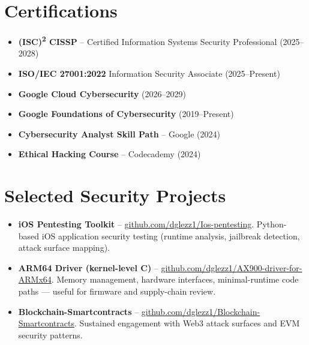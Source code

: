 \documentclass[11pt,a4paper,sans]{moderncv}
\begin{document}
\section{Certifications}
\vspace{1pt}
\begin{itemize}
\item \textbf{(ISC)\textsuperscript{2} CISSP} -- Certified Information Systems Security Professional (2025--2028)
\item \textbf{ISO/IEC 27001:2022} Information Security Associate (2025--Present)
\item \textbf{Google Cloud Cybersecurity} (2026--2029)
\item \textbf{Google Foundations of Cybersecurity} (2019--Present)
\item \textbf{Cybersecurity Analyst Skill Path} -- Google (2024)
\item \textbf{Ethical Hacking Course} -- Codecademy (2024)
\end{itemize}


\section{Selected Security Projects}
\vspace{1pt}
\begin{itemize}
\item{\textbf{iOS Pentesting Toolkit} -- \href{https://github.com/dglezz1/Ios-pentesting}{github.com/dglezz1/Ios-pentesting}. Python-based iOS application security testing (runtime analysis, jailbreak detection, attack surface mapping).}
\item{\textbf{ARM64 Driver (kernel-level C)} -- \href{https://github.com/dglezz1/AX900-driver-for-ARMx64}{github.com/dglezz1/AX900-driver-for-ARMx64}. Memory management, hardware interfaces, minimal-runtime code paths — useful for firmware and supply-chain review.}
\item{\textbf{Blockchain-Smartcontracts} -- \href{https://github.com/dglezz1/Blockchain-Smartcontracts}{github.com/dglezz1/Blockchain-Smartcontracts}. Sustained engagement with Web3 attack surfaces and EVM security patterns.}
\end{itemize}

\end{document}
